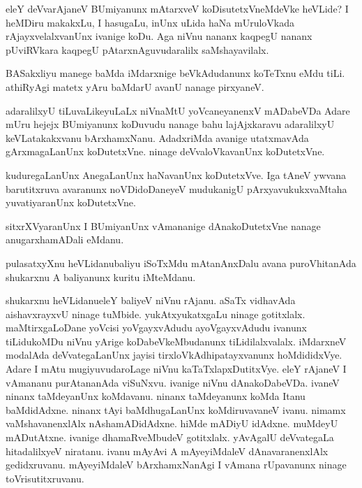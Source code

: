 \begin{mng}
eleY deVvarAjaneV BUmiyanunx mAtarxveV koDisutetxVneMdeVke heVLide? I heMDiru makakxLu, I hasugaLu, inUnx uLida haNa mUruloVkada rAjayxvelalxvanUnx ivanige koDu. Aga niVnu nananx kaqpegU nananx pUviRVkara kaqpegU pAtarxnAguvudaralilx saMshayavilalx.
\end{mng}

\begin{mng}
BASakxliyu manege baMda iMdarxnige beVkAdudanunx koTeTxnu eMdu tiLi. athiRyAgi matetx yAru baMdarU avanU nanage pirxyaneV.
\end{mng}

\begin{mng}
adaralilxyU tiLuvaLikeyuLaLx niVnaMtU yoVcaneyanenxV mADabeVDa Adare mUru hejejx BUmiyanunx koDuvudu nanage bahu lajAjxkaravu adaralilxyU keVLatakakxvanu bArxhamxNanu. AdadxriMda avanige utatxmavAda gArxmagaLanUnx koDutetxVne. ninage deVvaloVkavanUnx koDutetxVne.
\end{mng}

\begin{mng}
kuduregaLanUnx AnegaLanUnx haNavanUnx koDutetxVve. Iga tAneV ywvana barutitxruva avaranunx noVDidoDaneyeV mudukanigU pArxyavukukxvaMtaha yuvatiyaranUnx koDutetxVne.
\end{mng}

\begin{mng}
sitxrXVyaranUnx I BUmiyanUnx vAmananige dAnakoDutetxVne nanage anugarxhamADali eMdanu.
\end{mng}

\begin{mng}
pulasatxyXnu heVLidanu\mdash baliyu iSoTxMdu mAtanAnxDalu avana puroVhitanAda shukarxnu A baliyanunx kuritu iMteMdanu.
\end{mng}

\begin{mng}
shukarxnu heVLidanu\mdash eleY baliyeV niVnu rAjanu. aSaTx vidhavAda aishavxrayxvU ninage tuMbide. yukAtxyukatxgaLu ninage gotitxlalx. maMtirxgaLoDane yoVcisi yoVgayxvAdudu ayoVgayxvAdudu ivanunx tiLidukoMDu niVnu yArige koDabeVkeMbudanunx tiLidilalxvalalx. iMdarxneV modalAda deVvategaLanUnx jayisi tirxloVkAdhipatayxvanunx hoMdididxVye. Adare I mAtu mugiyuvudaroLage niVnu kaTaTxlapxDutitxVye. eleY rAjaneV I vAmananu purAtananAda viSuNxvu. ivanige niVnu dAnakoDabeVDa. ivaneV ninanx taMdeyanUnx koMdavanu. ninanx taMdeyanunx koMda Itanu baMdidAdxne. ninanx tAyi baMdhugaLanUnx koMdiruvavaneV ivanu. nimamx vaMshavanenxlAlx nAshamADidAdxne. hiMde mADiyU idAdxne. muMdeyU mADutAtxne. ivanige dhamaRveMbudeV gotitxlalx. yAvAgalU deVvategaLa hitadalilxyeV niratanu. ivanu mAyAvi A mAyeyiMdaleV dAnavaranenxlAlx gedidxruvanu. mAyeyiMdaleV bArxhamxNanAgi I vAmana rUpavanunx ninage toVrisutitxruvanu.
\end{mng}

